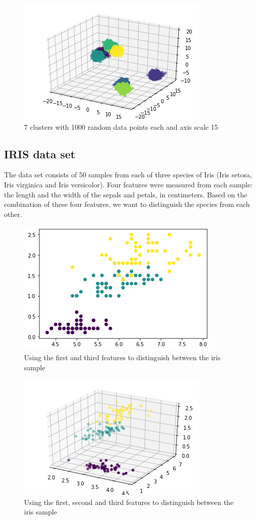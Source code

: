 \documentclass[12pt, a4paper]{paper}
\begin{document}
\begin{figure}[h!]
\centering
\includegraphics[scale=0.7]{c_7_dos_1000_spred_15.png}
\caption{7 clusters with 1000 random data points each and axis scale 15}
\label{fig:3D_2}
\end{figure}


\subsection*{IRIS data set}
The data set consists of 50 samples from each of three species of Iris (Iris setosa, Iris virginica and Iris versicolor). Four features were measured from each sample: the length and the width of the sepals and petals, in centimeters. Based on the combination of these four features, we want to distinguish the species from each other.

\begin{figure}[h!]
\centering
\includegraphics[scale=0.6]{iris_features_0_3.png}
\caption{Using the first and third features to distinguish between the iris sample}
\label{fig:iris_1}
\end{figure}

\begin{figure}[h!]
\centering
\includegraphics[scale=0.7]{iris_features_1_2_3.png}
\caption{Using the first, second and third features to distinguish between the iris sample}
\label{fig:iris_2}
\end{figure}
\end{document}
